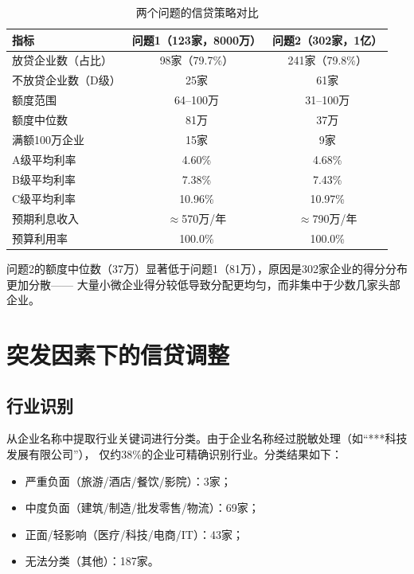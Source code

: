 \documentclass[12pt,a4paper]{ctexart}
\begin{document}
\begin{table}[H]
\centering
\caption{两个问题的信贷策略对比}
\label{tab:strategy_comparison}
\begin{tabular}{l|c|c}
\toprule
\textbf{指标} & \textbf{问题1（123家，8000万）} & \textbf{问题2（302家，1亿）} \\
\midrule
放贷企业数（占比） & 98家（79.7\%）  & 241家（79.8\%） \\
不放贷企业数（D级）& 25家            & 61家 \\
额度范围 & 64--100万      & 31--100万 \\
额度中位数 & 81万           & 37万 \\
满额100万企业 & 15家          & 9家 \\
A级平均利率 & 4.60\%         & 4.68\% \\
B级平均利率 & 7.38\%         & 7.43\% \\
C级平均利率 & 10.96\%        & 10.97\% \\
预期利息收入 & $\approx$570万/年 & $\approx$790万/年 \\
预算利用率 & 100.0\%         & 100.0\% \\
\bottomrule
\end{tabular}
\end{table}

问题2的额度中位数（37万）显著低于问题1（81万），原因是302家企业的得分分布更加分散——
大量小微企业得分较低导致分配更均匀，而非集中于少数几家头部企业。

\section{突发因素下的信贷调整}

\subsection{行业识别}

从企业名称中提取行业关键词进行分类。由于企业名称经过脱敏处理（如``***科技发展有限公司''），
仅约38\%的企业可精确识别行业。分类结果如下：
\begin{itemize}
    \item 严重负面（旅游/酒店/餐饮/影院）：3家；
    \item 中度负面（建筑/制造/批发零售/物流）：69家；
    \item 正面/轻影响（医疗/科技/电商/IT）：43家；
    \item 无法分类（其他）：187家。
\end{itemize}
\end{document}
